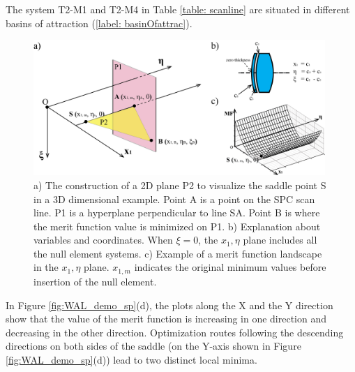 The system T2-M1 and T2-M4 in Table \ref{table: scanline} are situated in different basins of attraction (\ref{label: basinOfattrac}).  

\begin{figure}[h!]
    \centering
    \includegraphics[width=0.985\textwidth]{chapter-4/figures/hyperplane.png}
    \caption{ a) The construction of a 2D plane P2 to visualize the saddle point S in a 3D dimensional example. Point A is a point on the SPC scan line. P1 is a hyperplane perpendicular to line SA. Point B is where the merit function value is minimized on P1. b) Explanation about variables and coordinates. When $\xi = 0$, the $x_1, \eta$ plane includes all the null element systems. c) Example of a merit function landscape in the $x_1, \eta$  plane. $x_{1, m}$ indicates the original minimum values before insertion of the null element.}
    \label{fig:hyperplane}
\end{figure}
In Figure \ref{fig:WAL_demo_sp}(d), the plots along the X and the Y direction show that the value of the merit function is increasing in one direction and decreasing in the other direction. Optimization routes following the descending directions on both sides of the saddle (on the Y-axis shown in Figure \ref{fig:WAL_demo_sp}(d)) lead to two distinct local minima.

